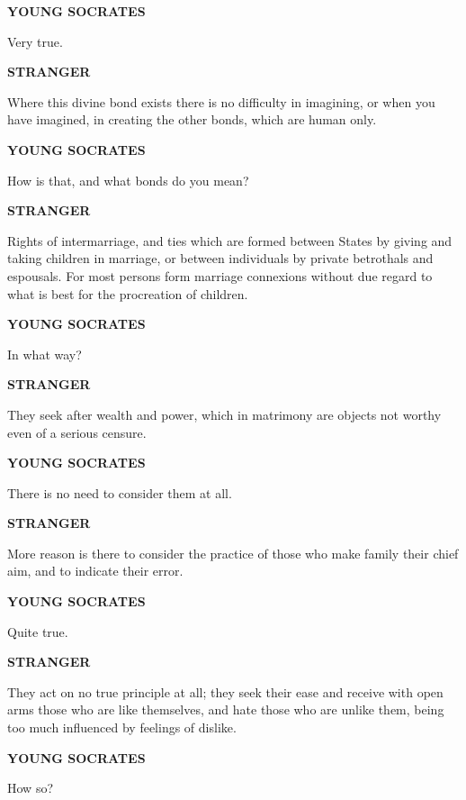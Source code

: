 \documentclass[11pt,letter]{article}
\begin{document}
\par \textbf{YOUNG SOCRATES}
\par   Very true.

\par \textbf{STRANGER}
\par   Where this divine bond exists there is no difficulty in imagining, or when you have imagined, in creating the other bonds, which are human only.

\par \textbf{YOUNG SOCRATES}
\par   How is that, and what bonds do you mean?

\par \textbf{STRANGER}
\par   Rights of intermarriage, and ties which are formed between States by giving and taking children in marriage, or between individuals by private betrothals and espousals. For most persons form marriage connexions without due regard to what is best for the procreation of children.

\par \textbf{YOUNG SOCRATES}
\par   In what way?

\par \textbf{STRANGER}
\par   They seek after wealth and power, which in matrimony are objects not worthy even of a serious censure.

\par \textbf{YOUNG SOCRATES}
\par   There is no need to consider them at all.

\par \textbf{STRANGER}
\par   More reason is there to consider the practice of those who make family their chief aim, and to indicate their error.

\par \textbf{YOUNG SOCRATES}
\par   Quite true.

\par \textbf{STRANGER}
\par   They act on no true principle at all; they seek their ease and receive with open arms those who are like themselves, and hate those who are unlike them, being too much influenced by feelings of dislike.

\par \textbf{YOUNG SOCRATES}
\par   How so?
\end{document}
